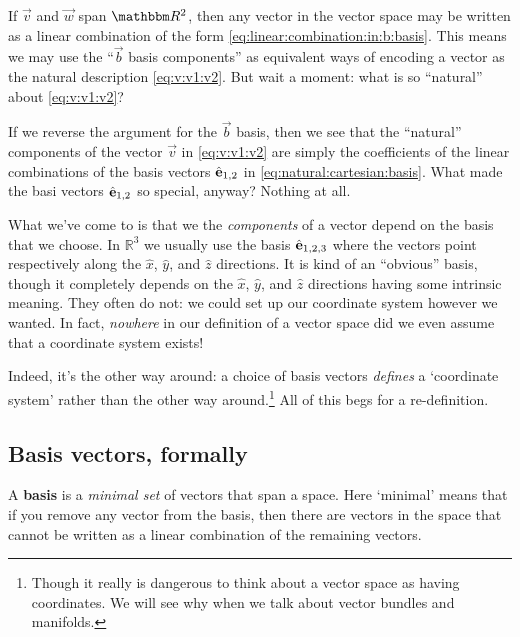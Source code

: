 \documentclass[12pt]{article}
\begin{document}
If $\vec{v}$ and $\vec{w}$ span $\RR ^2$, then any vector in the vector space may be written as a linear combination of the form \eqref{eq:linear:combination:in:b:basis}. This means we may use the ``$\vec{b}$ basis components'' as equivalent ways of encoding a vector as the natural description \eqref{eq:v:v1:v2}. But wait a moment: what is so ``natural'' about \eqref{eq:v:v1:v2}? 

If we reverse the argument for the $\vec{b}$ basis, then we see that the ``natural'' components of the vector $\vec{v}$ in \eqref{eq:v:v1:v2} are simply the coefficients of the linear combinations of the basis vectors ${\hat{\mathbf{e}}}_{1,2}$ in \eqref{eq:natural:cartesian:basis}. What made the basi vectors ${\hat{\mathbf{e}}}_{1,2}$ so special, anyway? Nothing at all. 

What we've come to is that we the \emph{components} of a vector depend on the basis that we choose. In $\mathbb{R}^3$ we usually use the basis ${\hat{\mathbf{e}}}_{1,2,3}$ where the vectors point respectively along the $\hat{x}$, $\hat{y}$, and $\hat{z}$ directions. It is kind of an ``obvious'' basis, though it completely depends on the $\hat{x}$, $\hat{y}$, and $\hat{z}$ directions having some intrinsic meaning. They often do not: we could set up our coordinate system however we wanted. In fact, \emph{nowhere} in our definition of a vector space did we even assume that a coordinate system exists!

Indeed, it's the other way around: a choice of basis vectors \emph{defines} a `coordinate system' rather than the other way around.\footnote{Though it really is dangerous to think about a vector space as having coordinates. We will see why when we talk about vector bundles and manifolds.} All of this begs for a re-definition.


\subsection{Basis vectors, formally}

A \textbf{basis} is a \emph{minimal set} of vectors that span a space. Here `minimal' means that if you remove any vector from the basis, then there are vectors in the space that cannot be written as a linear combination of the remaining vectors.
\end{document}

